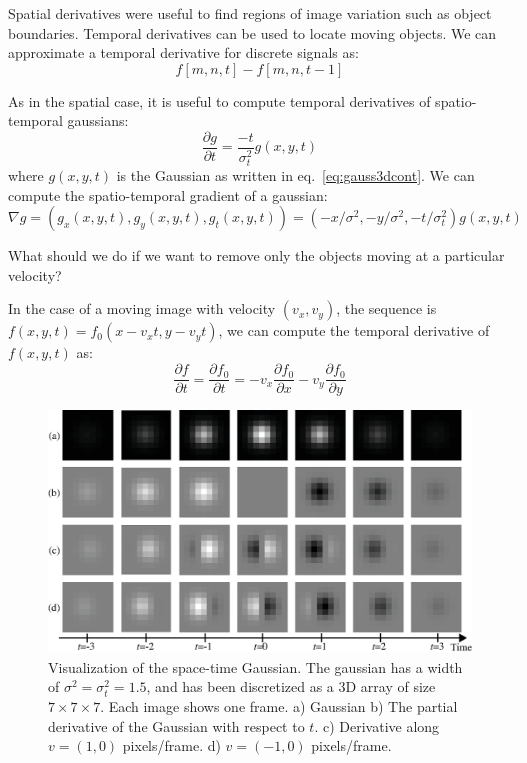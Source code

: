 Spatial derivatives were useful to find regions of image variation such as object boundaries. Temporal derivatives can be used to locate moving objects. We can approximate a temporal derivative for discrete signals as:
\begin{equation}
f \left[m,n,t\right] - f \left[m,n,t-1\right] 
\end{equation}

As in the spatial case, it is useful to compute temporal derivatives of spatio-temporal gaussians:
\begin{equation}
\frac{\partial g}{\partial t} = \frac{-t}{\sigma_t^2} g(x,y,t)
\end{equation}
where $g(x,y,t)$ is the Gaussian as written in eq.~\ref{eq:gauss3dcont}. We can compute the spatio-temporal gradient of a gaussian:
\begin{equation}
\nabla  g = \left( g_x(x,y,t), g_y(x,y,t), g_t(x,y,t) \right) =  \left(-x/\sigma^2, -y/\sigma^2, -t/\sigma_t^2 \right) g(x,y,t)
\end{equation}


What should we do if we want to remove only the objects moving at a particular velocity? 

In the case of a moving image with velocity $(v_x, v_y)$, the sequence is $f (x,y,t) = f_0 (x-v_xt,y-v_yt)$, we can compute the temporal derivative of $f(x,y,t)$ as:
\begin{equation}
\frac{\partial f}{\partial t} = \frac{\partial f_0}{\partial t} = -v_x \frac{\partial f_0}{\partial x} - v_y \frac{\partial f_0}{\partial y}
\label{eq:brightnessconstancy}
\end{equation}

\begin{figure}
\includegraphics[width=1\linewidth]{figures/temporal_filters/gaussians_xyt_seq.eps}
\caption{Visualization of the space-time Gaussian. The gaussian has a width of $\sigma^2=\sigma_t^2=1.5$, and has been discretized as a 3D array of size $7 \times 7 \times 7$. Each image shows one frame. a)  Gaussian b) The partial derivative of the Gaussian with respect to $t$. c) Derivative along $v=(1,0)$ pixels/frame. d) $v=(-1,0)$ pixels/frame.} 
\label{fig:gaussian_seq}
\end{figure}

